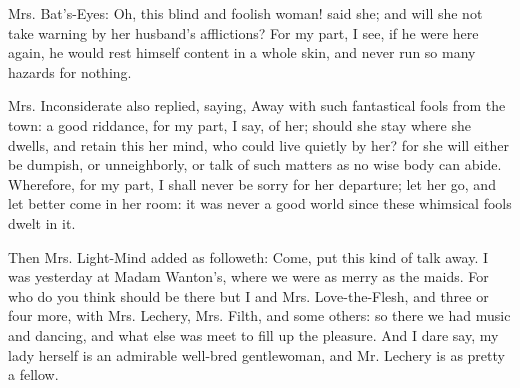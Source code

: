 Mrs. Bat's-Eyes: Oh, this blind and foolish woman! said she; and will she not take warning by her husband's afflictions? For my part, I see, if he were here again, he would rest himself content in a whole skin, and never run so many hazards for nothing.

Mrs. Inconsiderate also replied, saying, Away with such fantastical fools from the town: a good riddance, for my part, I say, of her; should she stay where she dwells, and retain this her mind, who could live quietly by her? for she will either be dumpish, or unneighborly, or talk of such matters as no wise body can abide. Wherefore, for my part, I shall never be sorry for her departure; let her go, and let better come in her room: it was never a good world since these whimsical fools dwelt in it.

Then Mrs. Light-Mind added as followeth: Come, put this kind of talk away. I was yesterday at Madam Wanton's, where we were as merry as the maids. For who do you think should be there but I and Mrs. Love-the-Flesh, and three or four more, with Mrs. Lechery, Mrs. Filth, and some others: so there we had music and dancing, and what else was meet to fill up the pleasure. And I dare say, my lady herself is an admirable well-bred gentlewoman, and Mr. Lechery is as pretty a fellow. 
